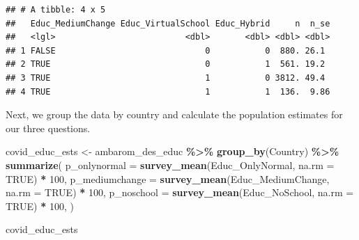 \documentclass[
]{krantz}
\makeatletter
\newenvironment{Shaded}{\begin{snugshade}}{\end{snugshade}}
\newcommand{\AttributeTok}[1]{\textcolor[rgb]{0.27,0.27,0.27}{#1}}
\newcommand{\ConstantTok}[1]{\textcolor[rgb]{0.37,0.37,0.37}{#1}}
\newcommand{\DecValTok}[1]{\textcolor[rgb]{0.06,0.06,0.06}{#1}}
\newcommand{\FunctionTok}[1]{\textcolor[rgb]{0.27,0.27,0.27}{\textbf{#1}}}
\newcommand{\NormalTok}[1]{#1}
\newcommand{\OtherTok}[1]{\textcolor[rgb]{0.37,0.37,0.37}{#1}}
\newcommand{\SpecialCharTok}[1]{\textcolor[rgb]{0.43,0.43,0.43}{\textbf{#1}}}
\newenvironment{kframe}{%
\medskip{}
\setlength{\fboxsep}{.8em}
 \def\at@end@of@kframe{}%
 \ifinner\ifhmode%
  \def\at@end@of@kframe{\end{minipage}}%
  \begin{minipage}{\columnwidth}%
 \fi\fi%
 \def\FrameCommand##1{\hskip\@totalleftmargin \hskip-\fboxsep
 \colorbox{shadecolor}{##1}\hskip-\fboxsep
     \hskip-\linewidth \hskip-\@totalleftmargin \hskip\columnwidth}%
 \MakeFramed {\advance\hsize-\width
   \@totalleftmargin\z@ \linewidth\hsize
   \@setminipage}}%
 {\par\unskip\endMakeFramed%
 \at@end@of@kframe}
\renewenvironment{Shaded}{\begin{kframe}}{\end{kframe}}
\makeatother
\begin{document}
\begin{verbatim}
## # A tibble: 4 x 5
##   Educ_MediumChange Educ_VirtualSchool Educ_Hybrid     n  n_se
##   <lgl>                          <dbl>       <dbl> <dbl> <dbl>
## 1 FALSE                              0           0  880. 26.1 
## 2 TRUE                               0           1  561. 19.2 
## 3 TRUE                               1           0 3812. 49.4 
## 4 TRUE                               1           1  136.  9.86
\end{verbatim}

Next, we group the data by country and calculate the population estimates for our three questions.

\begin{Shaded}
\begin{Highlighting}[]
\NormalTok{covid\_educ\_ests }\OtherTok{\textless{}{-}}
\NormalTok{  ambarom\_des\_educ }\SpecialCharTok{\%\textgreater{}\%}
  \FunctionTok{group\_by}\NormalTok{(Country) }\SpecialCharTok{\%\textgreater{}\%}
  \FunctionTok{summarize}\NormalTok{(}
    \AttributeTok{p\_onlynormal =} \FunctionTok{survey\_mean}\NormalTok{(Educ\_OnlyNormal, }\AttributeTok{na.rm =} \ConstantTok{TRUE}\NormalTok{) }\SpecialCharTok{*} \DecValTok{100}\NormalTok{,}
    \AttributeTok{p\_mediumchange =} \FunctionTok{survey\_mean}\NormalTok{(Educ\_MediumChange, }\AttributeTok{na.rm =} \ConstantTok{TRUE}\NormalTok{) }\SpecialCharTok{*} \DecValTok{100}\NormalTok{,}
    \AttributeTok{p\_noschool =} \FunctionTok{survey\_mean}\NormalTok{(Educ\_NoSchool, }\AttributeTok{na.rm =} \ConstantTok{TRUE}\NormalTok{) }\SpecialCharTok{*} \DecValTok{100}\NormalTok{,}
\NormalTok{  )}

\NormalTok{covid\_educ\_ests}
\end{Highlighting}
\end{Shaded}
\end{document}
